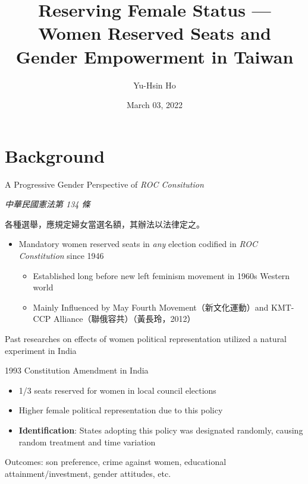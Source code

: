 \documentclass[
  9pt,
  ignorenonframetext,
  aspectratio=43,
]{beamer}
\title{Reserving Female Status --- Women Reserved Seats and Gender
Empowerment in Taiwan}
\author{Yu-Hsin Ho}
\date{March 03, 2022}
\institute{Department of Economics, National Taiwan University}
\providecommand{\tightlist}{%
  \setlength{\itemsep}{0pt}\setlength{\parskip}{0pt}}
\renewenvironment{quote}{\begin{customblockquote}\list{}{\rightmargin=0em\leftmargin=0em}%
\item\relax\color{blockquote-text}\ignorespaces}{\unskip\unskip\endlist\end{customblockquote}}
\begin{document}
\frame{\titlepage}

\begin{frame}
  \tableofcontents[hideallsubsections]
\end{frame}
\hypertarget{background}{%
\section{Background}\label{background}}

\begin{frame}{A Progressive Gender Perspective of \emph{ROC
Consitution}}
\protect\hypertarget{a-progressive-gender-perspective-of-roc-consitution}{}
\begin{quote}
\emph{中華民國憲法第 134 條}

各種選舉，應規定婦女當選名額，其辦法以法律定之。
\end{quote}

\begin{itemize}
\tightlist
\item
  Mandatory women reserved seats in \emph{any} election codified in
  \emph{ROC Constitution} since 1946

  \begin{itemize}
  \tightlist
  \item
    Established long before new left feminism movement in 1960s Western
    world
  \item
    Mainly Influenced by May Fourth Movement（新文化運動）and KMT-CCP
    Alliance（聯俄容共）（黃長玲，2012）
  \end{itemize}
\end{itemize}
\end{frame}

\begin{frame}
Past researches on effects of women political representation utilized a
natural experiment in India

\begin{block}{1993 Constitution Amendment in India}
\protect\hypertarget{constitution-amendment-in-india}{}
\begin{itemize}
\tightlist
\item
  1/3 seats reserved for women in local council elections
\item
  Higher female political representation due to this policy
\item
  \textbf{Identification}: States adopting this policy was designated
  randomly, causing random treatment and time variation
\end{itemize}

Outcomes: son preference, crime against women, educational
attainment/investment, gender attitudes, etc.
\end{block}
\end{frame}
\end{document}

